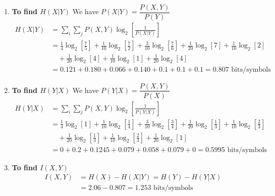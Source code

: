 \documentclass[12pt]{article}
\begin{document}
\begin{enumerate}
	\item[iii.] \textbf{To find $H(X|Y)$}
	      We have $P(X|Y) = \dfrac{P(X,Y)}{P(Y)}$
	      \begin{align*}
		      H(X|Y) & = \sum_i \sum_j P(X,Y) \log_2 \left[ \frac{1}{P(X|Y)} \right]                                                                                                                         \\
		             & = \frac{1}{4}\log_2\left[\frac{7}{5}\right] + \frac{1}{10}\log_2\left[\frac{7}{2}\right] + \frac{3}{10}\log_2\left[\frac{7}{6}\right] + \frac{1}{20}\log_2[7] + \frac{1}{10}\log_2[2] \\
		             & \quad + \frac{1}{20}\log_2[4] + \frac{1}{10}\log_2[1] + \frac{1}{20}\log_2[4]                                                                                                         \\
		             & = 0.121 + 0.180 + 0.066 + 0.140 + 0.1 + 0.1 + 0.1 = 0.807 \text{ bits/symbols}
	      \end{align*}

	\item[iv.] \textbf{To find $H(Y|X)$}
	      We have $P(Y|X) = \dfrac{P(X,Y)}{P(X)}$
	      \begin{align*}
		      H(Y|X) & = \sum_i \sum_j P(X,Y) \log_2 \left[ \frac{1}{P(Y|X)} \right]                                                                                                                                              \\
		             & = \frac{1}{4}\log_2[1] + \frac{1}{10}\log_2\left[\frac{1}{4}\right] + \frac{3}{10}\log_2\left[\frac{3}{4}\right] + \frac{1}{20}\log_2\left[\frac{1}{3}\right] + \frac{1}{10}\log_2\left[\frac{2}{3}\right] \\
		             & \quad + \frac{1}{20}\log_2\left[\frac{1}{3}\right] + \frac{1}{10}\log_2\left[\frac{2}{3}\right] + \frac{1}{20}\log_2[1]                                                                                    \\
		             & = 0 + 0.2 + 0.1245 + 0.079 + 0.058 + 0.079 + 0 = 0.5995 \text{ bits/symbols}
	      \end{align*}

	\item[v.] \textbf{To find $I(X,Y)$}
	      \begin{align*}
		      I(X,Y) & = H(X) - H(X|Y) = H(Y) - H(Y|X)             \\
		             & = 2.06 - 0.807 = 1.253 \text{ bits/symbols}
	      \end{align*}
\end{enumerate}
\end{document}
